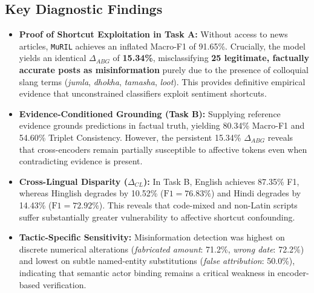 \documentclass[11pt,a4paper]{article}
\begin{document}
\subsection{Key Diagnostic Findings}
\begin{itemize}[leftmargin=*]
    \item \textbf{Proof of Shortcut Exploitation in Task A:} Without access to news articles, \texttt{MuRIL} achieves an inflated Macro-F1 of 91.65\%. Crucially, the model yields an identical $\Delta_{ABG}$ of \textbf{15.34\%}, misclassifying \textbf{25 legitimate, factually accurate posts as misinformation} purely due to the presence of colloquial slang terms (\textit{jumla}, \textit{dhokha}, \textit{tamasha}, \textit{loot}). This provides definitive empirical evidence that unconstrained classifiers exploit sentiment shortcuts.
    \item \textbf{Evidence-Conditioned Grounding (Task B):} Supplying reference evidence grounds predictions in factual truth, yielding 80.34\% Macro-F1 and 54.60\% Triplet Consistency. However, the persistent 15.34\% $\Delta_{ABG}$ reveals that cross-encoders remain partially susceptible to affective tokens even when contradicting evidence is present.
    \item \textbf{Cross-Lingual Disparity ($\Delta_{CL}$):} In Task B, English achieves 87.35\% F1, whereas Hinglish degrades by 10.52\% ($\text{F1} = 76.83\%$) and Hindi degrades by 14.43\% ($\text{F1} = 72.92\%$). This reveals that code-mixed and non-Latin scripts suffer substantially greater vulnerability to affective shortcut confounding.
    \item \textbf{Tactic-Specific Sensitivity:} Misinformation detection was highest on discrete numerical alterations (\textit{fabricated amount}: 71.2\%, \textit{wrong date}: 72.2\%) and lowest on subtle named-entity substitutions (\textit{false attribution}: 50.0\%), indicating that semantic actor binding remains a critical weakness in encoder-based verification.
\end{itemize}
\end{document}
